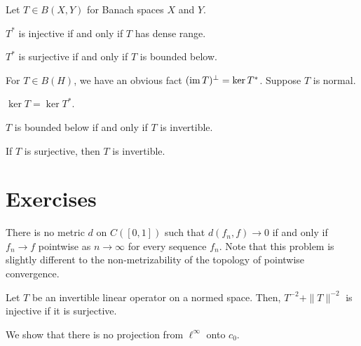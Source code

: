 \documentclass{../note}
\begin{document}
\begin{prb}
Let $T\in B(X,Y)$ for Banach spaces $X$ and $Y$.
\begin{parts}
\item $T^*$ is injective if and only if $T$ has dense range.
\item $T^*$ is surjective if and only if $T$ is bounded below.
\end{parts}
\end{prb}

\begin{prb}
For $T\in B(H)$, we have an obvious fact $(\operatorname{im} T)^\perp=\ker T^*$.
Suppose $T$ is normal.
\begin{parts}
\item $\ker T=\ker T^*$.
\item $T$ is bounded below if and only if $T$ is invertible.
\item If $T$ is surjective, then $T$ is invertible.
\end{parts}
\end{prb}






\section*{Exercises}
\begin{prb}
There is no metric $d$ on $C([0,1])$ such that $d(f_n,f)\to0$ if and only if $f_n\to f$ pointwise as $n\to\infty$ for every sequence $f_n$.
Note that this problem is slightly different to the non-metrizability of the topology of pointwise convergence.
\end{prb}

\begin{prb}
Let $T$ be an invertible linear operator on a normed space.
Then, $T^{-2}+\|T\|^{-2}$ is injective if it is surjective.
\end{prb}

\begin{prb}
We show that there is no projection from $\ell^\infty$ onto $c_0$.
\end{prb}

\begin{prb}
\end{prb}
\end{document}
